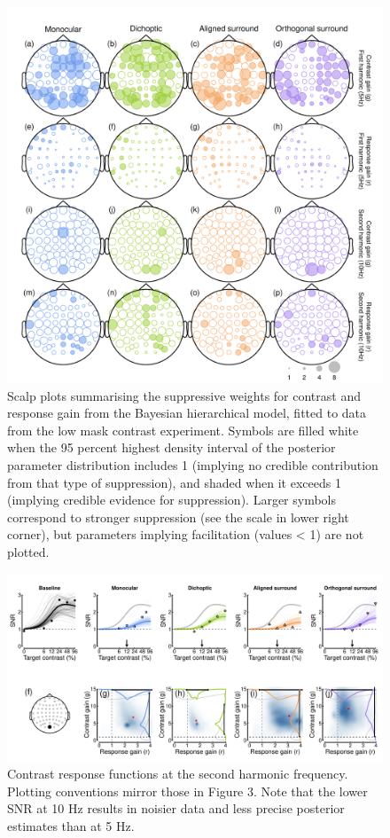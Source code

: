 \documentclass[]{article}
\begin{document}
\begin{figure}

{\centering \includegraphics{figures/modelheads1} 

}

\caption{Scalp plots summarising the suppressive weights for contrast and response gain from the Bayesian hierarchical model, fitted to data from the low mask contrast experiment. Symbols are filled white when the 95 percent highest density interval of the posterior parameter distribution includes 1 (implying no credible contribution from that type of suppression), and shaded when it exceeds 1 (implying credible evidence for suppression). Larger symbols correspond to stronger suppression (see the scale in lower right corner), but parameters implying facilitation (values < 1) are not plotted.}\label{fig:modelheads1}
\end{figure}

\begin{figure}

{\centering \includegraphics{figures/modelfig2} 

}

\caption{Contrast response functions at the second harmonic frequency. Plotting conventions mirror those in Figure 3. Note that the lower SNR at 10 Hz results in noisier data and less precise posterior estimates than at 5 Hz.}\label{fig:modelfig2}
\end{figure}
\end{document}
